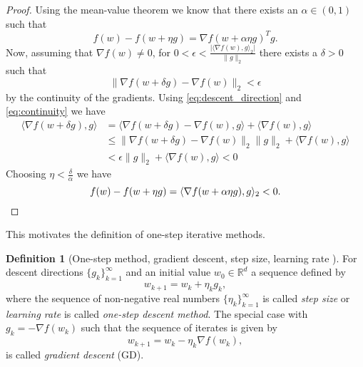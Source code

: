 \documentclass[12pt]{article}
\theoremstyle{definition}
\newtheorem{definition}[definition]{Definition}
\numberwithin{equation}{section}
\newcommand{\R}{\mathbb{R}}
\newcommand{\norm}[1]{\lVert{#1}\rVert_2}
\newcommand{\scp}[2]{\langle{#1}, {#2}\rangle_2}
\begin{document}
\begin{proof}
  Using the mean-value theorem \cite[pp.~629]{nocedalNumericalOptimization2006} we know that there exists an $\alpha \in (0,1)$ such that 
  \begin{equation*}
    f(w) - f(w + \eta g) = \nabla f(w+\alpha\eta g)^Tg.
  \end{equation*}
  Now, assuming that $\nabla f (w) \neq 0$, for $0 < \epsilon <
  \frac{\lvert\scp{\nabla f(w)}{g}\rvert}{\norm{g}}$ there exists a $\delta > 0$ such that 
  \begin{equation}
    \label{eq:continuity}
    \norm{\nabla f(w + \delta g) - \nabla f(w)} < \epsilon
  \end{equation}
  by the continuity of the gradients.
  Using \eqref{eq:descent_direction} and \eqref{eq:continuity} we have
  \begin{equation*}
    \begin{split}
      \langle\nabla f(w + \delta g), g \rangle &= \langle \nabla f(w + \delta g)- \nabla f(w), g \rangle + \langle \nabla f(w), g \rangle \\
      &\leq \norm{\nabla f(w + \delta g)- \nabla f(w)}\norm{g} + \langle \nabla f(w), g \rangle \\
      &< \epsilon \norm{g} + \langle \nabla f(w), g \rangle < 0
    \end{split}
  \end{equation*}
  Choosing $\eta < \frac{\delta}{\alpha}$ we have
  \begin{equation*}
    f(w) - f(w + \eta g) = \scp{\nabla f(w+\alpha\eta g)}{g} < 0. \qedhere
  \end{equation*}
\end{proof}
This motivates the definition of one-step iterative methods.
\begin{definition}[One-step method, gradient descent, step size, learning rate ]
  For descent directions $\{g_k\}_{k=1}^\infty$ and an initial value $w_{0}\in \R^d$ a sequence defined by
\begin{equation*}
  w_{k+1} = w_{k} + \eta_k g_k,
\end{equation*}
  where the sequence of non-negative real numbers $\{\eta_k\}_{k=1}^\infty$ is called \emph{step size} or \emph{learning rate} is called \emph{one-step descent method}. The special case with $g_k = -\nabla f(w_k)$ such that the sequence of iterates is given by
  \begin{equation}
    \label{eq:gradient_descent}
    w_{k+1} = w_{k} - \eta_k \nabla f(w_{k}),
  \end{equation}
  is called \emph{gradient descent} (GD).
\end{definition}
\end{document}
